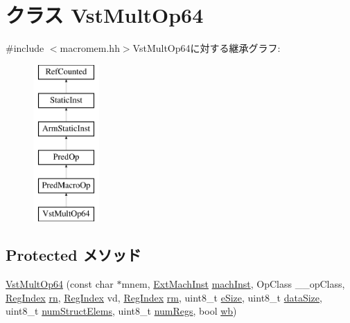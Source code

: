 \hypertarget{classArmISA_1_1VstMultOp64}{
\section{クラス VstMultOp64}
\label{classArmISA_1_1VstMultOp64}
}


{\ttfamily \#include $<$macromem.hh$>$}VstMultOp64に対する継承グラフ:\begin{figure}[H]
\begin{center}
\leavevmode
\includegraphics[height=6cm]{classArmISA_1_1VstMultOp64}
\end{center}
\end{figure}
\subsection*{Protected メソッド}
\begin{DoxyCompactItemize}
\item 
\hyperlink{classArmISA_1_1VstMultOp64_a276ccadb6451c16bf40551c3ae4b5cb5}{VstMultOp64} (const char $\ast$mnem, \hyperlink{classStaticInst_a5605d4fc727eae9e595325c90c0ec108}{ExtMachInst} \hyperlink{classStaticInst_a744598b194ca3d4201d9414ce4cc4af4}{machInst}, OpClass \_\-\_\-opClass, \hyperlink{classStaticInst_a36d25e03e43fa3bb4c5482cbefe5e0fb}{RegIndex} \hyperlink{namespaceArmISA_adf8c6c579ad8729095a637a4f2181211}{rn}, \hyperlink{classStaticInst_a36d25e03e43fa3bb4c5482cbefe5e0fb}{RegIndex} vd, \hyperlink{classStaticInst_a36d25e03e43fa3bb4c5482cbefe5e0fb}{RegIndex} \hyperlink{namespaceArmISA_ad546c2cf2168cf2d8ac21b2a9f485e82}{rm}, uint8\_\-t \hyperlink{classArmISA_1_1VstMultOp64_aac129ded07ba57383c5e2540f22c94ef}{eSize}, uint8\_\-t \hyperlink{classArmISA_1_1VstMultOp64_af13e629a2f79d14821c7b9246ef99e9f}{dataSize}, uint8\_\-t \hyperlink{classArmISA_1_1VstMultOp64_afb0be420b537599a5b86558127502040}{numStructElems}, uint8\_\-t \hyperlink{classArmISA_1_1VstMultOp64_a7a5268882c913c394a8ad4d988eb94e6}{numRegs}, bool \hyperlink{classArmISA_1_1VstMultOp64_a93541ed16711b2c9c53cf093b675d90b}{wb})
\end{DoxyCompactItemize}
